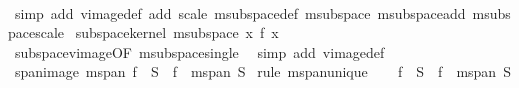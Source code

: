 \begin{isabellebody}
%
\isadelimproof
\ \ %
\endisadelimproof
%
\isatagproof
{}\isamarkupfalse%
\ {\isacharparenleft}{\kern0pt}simp\ add{\isacharcolon}{\kern0pt}\ vimage{\isacharunderscore}{\kern0pt}def\ add\ scale\ m{}{\isachardot}{\kern0pt}subspace{\isacharunderscore}{\kern0pt}def\ m{}{\isachardot}{\kern0pt}subspace{\isacharunderscore}{\kern0pt}{}\ m{}{\isachardot}{\kern0pt}subspace{\isacharunderscore}{\kern0pt}add\ m{}{\isachardot}{\kern0pt}subspace{\isacharunderscore}{\kern0pt}scale{\isacharparenright}{\kern0pt}%
\endisatagproof
{\isafoldproof}%
%
\isadelimproof
\isanewline
%
\endisadelimproof
\isanewline
{}\isamarkupfalse%
\ subspace{\isacharunderscore}{\kern0pt}kernel{\isacharcolon}{\kern0pt}\ {\isachardoublequoteopen}m{}{\isachardot}{\kern0pt}subspace\ {\isacharbraceleft}{\kern0pt}x{\isachardot}{\kern0pt}\ f\ x\ {\isacharequal}{\kern0pt}\ {}{\isacharbraceright}{\kern0pt}{\isachardoublequoteclose}\isanewline
%
\isadelimproof
\ \ %
\endisadelimproof
%
\isatagproof
{}\isamarkupfalse%
\ subspace{\isacharunderscore}{\kern0pt}vimage{\isacharbrackleft}{\kern0pt}OF\ m{}{\isachardot}{\kern0pt}subspace{\isacharunderscore}{\kern0pt}single{\isacharunderscore}{\kern0pt}{}{\isacharbrackright}{\kern0pt}\ \isamarkupfalse%
\ {\isacharparenleft}{\kern0pt}simp\ add{\isacharcolon}{\kern0pt}\ vimage{\isacharunderscore}{\kern0pt}def{\isacharparenright}{\kern0pt}%
\endisatagproof
{\isafoldproof}%
%
\isadelimproof
\isanewline
%
\endisadelimproof
\isanewline
{}\isamarkupfalse%
\ span{\isacharunderscore}{\kern0pt}image{\isacharcolon}{\kern0pt}\ {\isachardoublequoteopen}m{}{\isachardot}{\kern0pt}span\ {\isacharparenleft}{\kern0pt}f\ {\isacharbackquote}{\kern0pt}\ S{\isacharparenright}{\kern0pt}\ {\isacharequal}{\kern0pt}\ f\ {\isacharbackquote}{\kern0pt}\ {\isacharparenleft}{\kern0pt}m{}{\isachardot}{\kern0pt}span\ S{\isacharparenright}{\kern0pt}{\isachardoublequoteclose}\isanewline
%
\isadelimproof
%
\endisadelimproof
%
\isatagproof
{}\isamarkupfalse%
\ {\isacharparenleft}{\kern0pt}rule\ m{}{\isachardot}{\kern0pt}span{\isacharunderscore}{\kern0pt}unique{\isacharparenright}{\kern0pt}\isanewline
\ \ \isamarkupfalse%
\ {\isachardoublequoteopen}f\ {\isacharbackquote}{\kern0pt}\ S\ {\isasymsubseteq}\ f\ {\isacharbackquote}{\kern0pt}\ m{}{\isachardot}{\kern0pt}span\ S{\isachardoublequoteclose}\isanewline
\ \ \ \ \isamarkupfalse%

\end{isabellebody}
